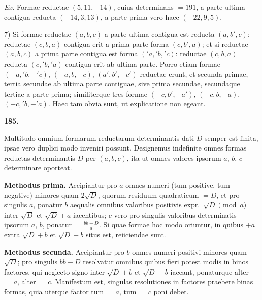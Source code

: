 \documentclass[12pt,a4paper]{article}
\theoremstyle{plain}
\begin{document}
\textit{Ex.} Formae reductae $(5, 11, -14)$, cuius determinans $= 191$, a parte ultima contigua reducta $(-14, 3, 13)$, a parte prima vero haec $(-22, 9, 5)$.

7) Si formae reductae $(a,b,c)$ a parte ultima contigua est reducta $(a, b', c)$: reductae $(c, b, a)$ contigua erit a prima parte forma $(c, b', a)$; et si reductae $(a,b,c)$ a prima parte contigua est forma $('a, 'b, 'c)$: reductae $(c, b, a)$ reducta $(c, 'b, 'a)$ contigua erit ab ultima parte. Porro etiam formae $(-a, 'b, -'c)$, $(-a, b, -c)$, $(a', b', -c')$ reductae erunt, et secunda primae, tertia secundae ab ultima parte contiguae, sive prima secundae, secundaque tertiae a parte prima; similiterque tres formae $(-c, b', -a')$, $(-c, b, -a)$, $(-c, 'b, -'a)$. Haec tam obvia sunt, ut explicatione non egeant.

\bigskip

\textbf{185.}

Multitudo omnium formarum reductarum determinantis dati $D$ semper est finita, ipsae vero duplici modo inveniri possunt. Designemus indefinite omnes formas reductas determinantis $D$ per $(a,b,c)$, ita ut omnes valores ipsorum $a$, $b$, $c$ determinare oporteat.

\textbf{Methodus prima.} Accipiantur pro $a$ omnes numeri (tum positive, tum negative) minores quam $2\sqrt{D}$, quorum residuum quadraticum $= D$, et pro singulis $a$, ponatur $b$ aequalis omnibus valoribus positivis expr.~$\sqrt{D} \pmod{a}$ inter $\sqrt{D}$ et $\sqrt{D} \mp a$ iacentibus; $c$ vero pro singulis valoribus determinatis ipsorum $a$, $b$, ponatur $= \frac{bb - D}{a}$. Si quae formae hoc modo oriuntur, in quibus $+a$ extra $\sqrt{D} + b$ et $\sqrt{D} - b$ situs est, reiiciendae sunt.

\textbf{Methodus secunda.} Accipiantur pro $b$ omnes numeri positivi minores quam $\sqrt{D}$; pro singulis $bb - D$ resolvatur omnibus quibus fieri potest modis in binos factores, qui neglecto signo inter $\sqrt{D} + b$ et $\sqrt{D} - b$ iaceant, ponaturque alter $= a$, alter $= c$. Manifestum est, singulas resolutiones in factores praebere binas formas, quia uterque factor tum $= a$, tum $= c$ poni debet.
\end{document}
